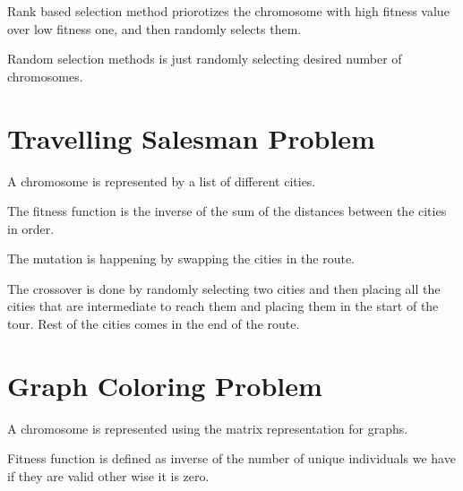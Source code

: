 \documentclass[12pt]{report}
\theoremstyle{mytheoremstyle}
\theoremstyle{mytheoremstyle}
\theoremstyle{myproblemstyle}
\begin{document}
\newpage

Rank based selection method priorotizes the chromosome with high fitness value over low fitness one, and then randomly selects them.

Random selection methods is just randomly selecting desired number of chromosomes.


\newpage

\section{Travelling Salesman Problem}
A chromosome is represented by a list of different cities.

The fitness function is the inverse of the sum of the distances between the cities in order.


\newpage

The mutation is happening by swapping the cities in the route.

The crossover is done by randomly selecting two cities and then placing all the cities that are intermediate to reach them and placing them in the start of the tour. Rest of the cities comes in the end of the route.


\newpage

\section{Graph Coloring Problem}
A chromosome is represented using the matrix representation for graphs.

Fitness function is defined as inverse of the number of unique individuals we have if they are valid other wise it is zero.

\end{document}
